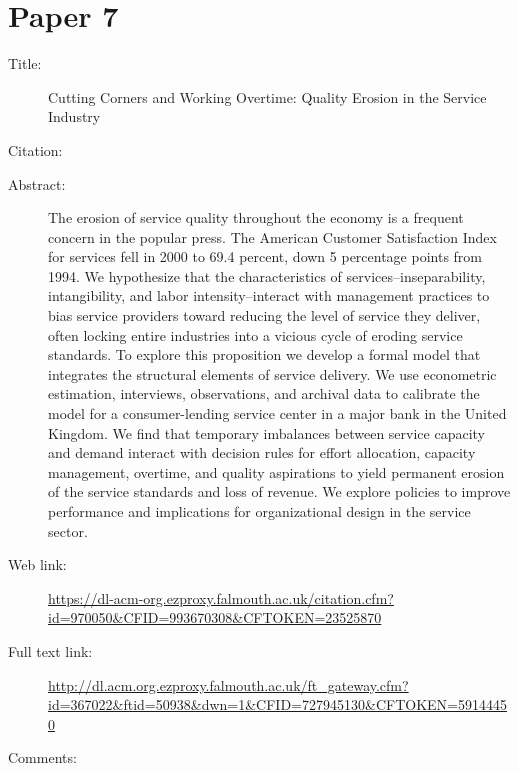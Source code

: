 \documentclass{scrartcl}
\begin{document}
\section*{Paper 7}
\begin{description}
\item[Title:]Cutting Corners and Working Overtime: Quality Erosion in the Service Industry
\item[Citation:] \cite{oliva2001cutting}
\item[Abstract:] The erosion of service quality throughout the economy is a frequent concern in the popular press. The American Customer Satisfaction Index for services fell in 2000 to 69.4 percent, down 5 percentage points from 1994. We hypothesize that the characteristics of services--inseparability, intangibility, and labor intensity--interact with management practices to bias service providers toward reducing the level of service they deliver, often locking entire industries into a vicious cycle of eroding service standards. To explore this proposition we develop a formal model that integrates the structural elements of service delivery. We use econometric estimation, interviews, observations, and archival data to calibrate the model for a consumer-lending service center in a major bank in the United Kingdom. We find that temporary imbalances between service capacity and demand interact with decision rules for effort allocation, capacity management, overtime, and quality aspirations to yield permanent erosion of the service standards and loss of revenue. We explore policies to improve performance and implications for organizational design in the service sector.
\item[Web link:]\url  {https://dl-acm-org.ezproxy.falmouth.ac.uk/citation.cfm?id=970050&CFID=993670308&CFTOKEN=23525870}
\item[Full text link:]\url { http://dl.acm.org.ezproxy.falmouth.ac.uk/ft_gateway.cfm?id=367022&ftid=50938&dwn=1&CFID=727945130&CFTOKEN=59144450}
\item[Comments:] 
\end{description}
\end{document}
